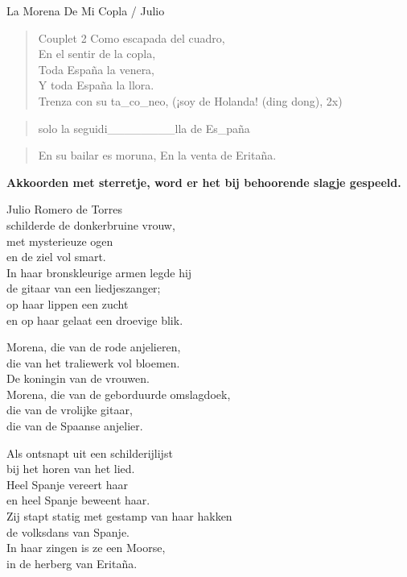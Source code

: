 \begin{song}{La Morena De Mi Copla / Julio}

\begin{verse}{Couplet 2}
Como escapada del cuadro,\\
En el sentir de la copla,\\
Toda España la venera,\chord{}\\
Y toda España la llora.\\
Trenza con su ta\_co\_neo, (¡soy de Holanda! \small{(ding dong)}, 2x)
\end{verse}

\begin{verse}{solo}
la seguidi\_\_\_\_\_\_\_\_lla de Es\_paña
\end{verse}

\begin{verse}{}
En su bailar es moruna,\hspace{4em}
En la venta de Eritaña.

\end{verse}
\end{song}

\clearpage
\textbf{Akkoorden met sterretje, word er het bij behoorende slagje gespeeld.}\\

\begin{translation}
Julio Romero de Torres\\
schilderde de donkerbruine vrouw,\\
met mysterieuze ogen\\
en de ziel vol smart.\\
In haar bronskleurige armen legde hij\\
de gitaar van een liedjeszanger;\\
op haar lippen een zucht\\
en op haar gelaat een droevige blik.\vspace{\wlskip}

Morena, die van de rode anjelieren,\\
die van het traliewerk vol bloemen.\\
De koningin van de vrouwen.\\
Morena, die van de geborduurde omslagdoek,\\
die van de vrolijke gitaar,\\
die van de Spaanse anjelier.\vspace{\wlskip}

Als ontsnapt uit een schilderijlijst\\
bij het horen van het lied.\\
Heel Spanje vereert haar\\
en heel Spanje beweent haar.\\
Zij stapt statig met gestamp van haar hakken\\
de volksdans van Spanje.\\
In haar zingen is ze een Moorse,\\
in de herberg van Eritaña.
\end{translation}
